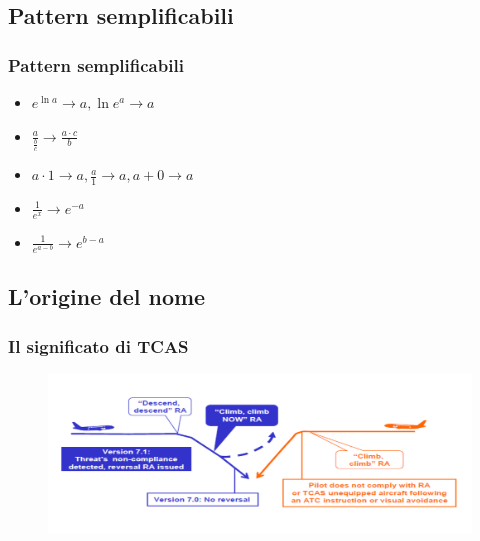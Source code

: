 \documentclass[aspectratio=149]{beamer}
\begin{document}
	\subsection{Pattern semplificabili}
	\begin{frame}
		\frametitle{Pattern semplificabili}
		\begin{itemize}
			\pause \item \(e^{\ln{a}} \rightarrow a, \ln{e^{a}} \rightarrow a\)
			\pause \item \(\frac{a}{\frac{b}{c}} \rightarrow \frac{a \cdot c}{b}\)
			\pause \item \(a \cdot 1 \rightarrow a, \frac{a}{1} \rightarrow a, a + 0 \rightarrow a\)
			\pause \item \(\frac{1}{e^{x}} \rightarrow e^{-a}\)
			\pause \item \(\frac{1}{e^{a - b}} \rightarrow e^{b - a}\)
		\end{itemize}
	\end{frame}
	
	\subsection{L'origine del nome}
	\begin{frame}
		\frametitle{Il significato di TCAS}
		\begin{figure}
			\includegraphics[width=1.0\textwidth]{pres_img/tcas.png}
		\end{figure}
	\end{frame}
	
\end{document}
